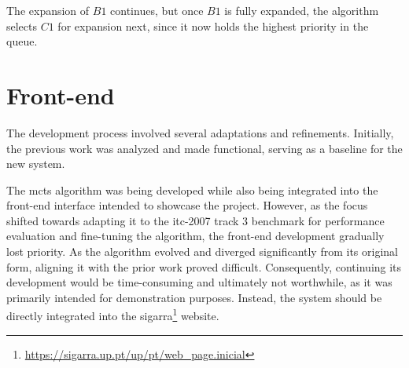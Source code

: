 The expansion of \(B1\) continues, but once \(B1\) is fully expanded, the algorithm selects \(C1\) for expansion next, since it now holds the highest priority in the queue.

\section{Front-end}

The development process involved several adaptations and refinements. Initially, the previous work was analyzed and made functional, serving as a baseline for the new system. 

The \ac{mcts} algorithm was being developed while also being integrated into the front-end  interface intended to showcase the project. However, as the focus shifted towards adapting it to the \ac{itc-2007} track 3 benchmark for performance evaluation and fine-tuning the algorithm, the front-end development gradually lost priority. As the algorithm evolved and diverged significantly from its original form, aligning it with the prior work proved difficult. Consequently, continuing its development would be time-consuming and ultimately not worthwhile, as it was primarily intended for demonstration purposes. Instead, the system should be directly integrated into the sigarra\footnote{\url{https://sigarra.up.pt/up/pt/web\_page.inicial}} website.

